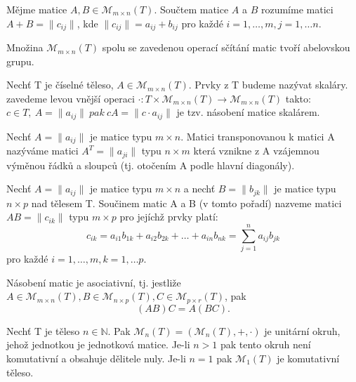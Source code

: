 \begin{definition}
	Mějme matice $A,B \in \mathscr{M}_{m \times n}(T)$. Součtem matice $A$ a $B$ rozumíme matici $A + B = \|c_{ij}\|$, kde $ \|c_{ij}\| =  a_{ij} + b_{ij}$ pro každé $i = 1, \dots, m, j = 1, \dots n.$
\end{definition}

\begin{sentence}
	Množina $\mathscr{M}_{m \times n}(T)$ spolu se zavedenou operací sčítání matic tvoří abelovskou grupu.
\end{sentence}
\begin{definition}
	Nechť T je číselné těleso, $A \in \mathscr{M}_{m \times n}(T)$. Prvky z T budeme nazývat skaláry. zavedeme levou vnější operaci $\cdot : T \times  \mathscr{M}_{m \times n}(T) \rightarrow \mathscr{M}_{m \times n}(T)$ takto: $c \in T, \ A= \| a_{ij} \| \ pak \ cA = \|c \cdot a_{ij} \|$ je tzv. násobení matice skalárem.
\end{definition}

\begin{definition}
	Nechť $A= \| a_{ij} \|$ je matice typu $m \times n$. Matici transponovanou k matici A nazýváme matici $A^T = \| a_{ji} \|$ typu $n \times m$ která vznikne z A vzájemnou výměnou řádků a sloupců (tj. otočením A podle hlavní diagonály).
\end{definition}

\begin{definition}
	Nechť $A= \| a_{ij} \|$ je matice typu $m \times n$ a nechť $B= \| b_{jk} \|$ je matice typu $n \times p$  nad tělesem T. Součinem matic A a B (v tomto pořadí) nazveme matici $AB =  \| c_{ik} \|$ typu $m \times p$ pro jejíchž prvky platí: $$c_{ik} = a_{i1}b_{1k} + a_{i2}b_{2k} + \dots + a_{in}b_{nk} = \sum^n_{j=1} a_{ij}b_{jk}$$
	pro každé $i = 1, \dots, m, k = 1, \dots p.$
\end{definition}

\begin{sentence}
	Násobení matic je asociativní, tj. jestliže $A \in \mathscr{M}_{m \times n}(T), B \in \mathscr{M}_{n \times p}(T), C \in \mathscr{M}_{p \times r}(T)$, pak $$(AB)C = A(BC).$$
\end{sentence}

\begin{sentence}
	Nechť T je těleso $n \in \mathbb{N}$. Pak $ \mathscr{M}_{n}(T) = (\mathscr{M}_{n}(T) ,+,\cdot)$ je unitární okruh, jehož jednotkou je jednotková matice. Je-li $n > 1$ pak tento okruh není komutativní a obsahuje dělitele nuly. Je-li $n = 1$ pak $\mathscr{M}_{1}(T)$  je komutativní těleso.
\end{sentence}

